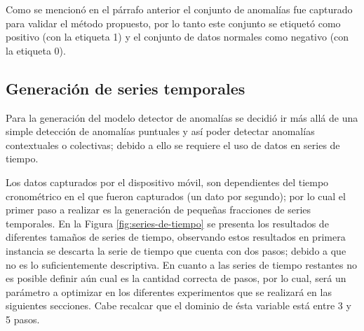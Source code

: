 \vspace{5mm} %

Como se mencion\'{o} en el p\'{a}rrafo anterior el conjunto de anomal\'{i}as fue capturado para validar el m\'{e}todo propuesto, por lo tanto este conjunto se etiquet\'{o} como positivo (con la etiqueta 1) y el conjunto de datos normales como negativo (con la etiqueta 0).

\subsection{Generaci\'{o}n de series temporales}

Para la generaci\'{o}n del modelo detector de anomal\'{i}as se decidi\'{o} ir m\'{a}s all\'{a} de una simple detecci\'{o}n de anomal\'{i}as puntuales y as\'{i} poder detectar anomal\'{i}as contextuales o colectivas; debido a ello se requiere el uso de datos en series de tiempo.

\vspace{5mm} %

Los datos capturados por el dispositivo m\'{o}vil, son dependientes del tiempo cronom\'{e}trico en el que fueron capturados (un dato por segundo); por lo cual el primer paso a realizar es la generaci\'{o}n de peque\~{n}as fracciones de series temporales. En la Figura \ref{fig:series-de-tiempo} se presenta los resultados de diferentes tama\~{n}os de series de tiempo, observando estos resultados en primera instancia se descarta la serie de tiempo que cuenta con dos pasos; debido a que no es lo suficientemente descriptiva. En cuanto a las series de tiempo restantes no es posible definir a\'{u}n cual es la cantidad correcta de pasos, por lo cual, ser\'{a} un par\'{a}metro a optimizar en los diferentes experimentos que se realizar\'{a} en las siguientes secciones. Cabe recalcar que el dominio de \'{e}sta variable est\'{a} entre 3 y 5 pasos.

